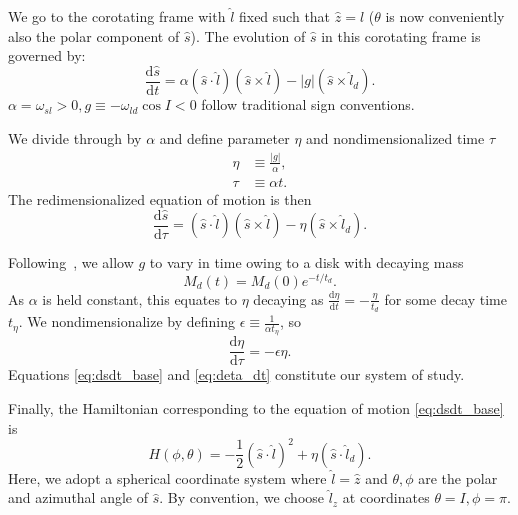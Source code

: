 \documentclass[
        fleqn,
        usenatbib,
    ]{mnras}
\newcommand*{\rd}[2]{\frac{\mathrm{d}#1}{\mathrm{d}#2}}
\newcommand*{\abs}[1]{\left|#1\right|}
\newcommand*{\p}[1]{\left(#1\right)}
\begin{document}
We go to the corotating frame with $\hat{l}$ fixed such that $\hat{z} =
\hat{l}$ ($\theta$ is now conveniently also the polar component of $\hat{s}$).
The evolution of $\hat{s}$ in this corotating frame is governed by:
\begin{equation}
    \rd{\hat{s}}{t} = \alpha \p{\hat{s} \cdot \hat{l}}
            \p{\hat{s} \times \hat{l}}
        - \abs{g}\p{\hat{s} \times \hat{l}_d}.
\end{equation}
$\alpha = \omega_{sl} > 0, g \equiv -\omega_{ld}\cos I < 0$ follow traditional
sign conventions.

We divide through by $\alpha$ and define parameter $\eta$ and nondimensionalized
time $\tau$
\begin{align}
    \eta &\equiv \frac{\abs{g}}{\alpha}\label{eq:eta},\\
    \tau &\equiv \alpha t.
\end{align}
The redimensionalized equation of motion is then
\begin{equation}
    \rd{\hat{s}}{\tau} = \p{\hat{s} \cdot \hat{l}}
            \p{\hat{s} \times \hat{l}}
        - \eta\p{\hat{s} \times \hat{l}_d}. \label{eq:dsdt_base}
\end{equation}

Following~\cite{millholland_disk}, we allow $g$ to vary in time owing to a
disk with decaying mass
\begin{equation}
    M_d(t) = M_d(0)e^{-t/t_d}.
\end{equation}
As $\alpha$ is held constant, this equates to $\eta$ decaying as $\rd{\eta}{t} =
-\frac{\eta}{t_d}$ for some decay time $t_\eta$. We nondimensionalize by
defining $\epsilon \equiv \frac{1}{\alpha t_\eta}$, so
\begin{equation}
    \rd{\eta}{\tau} = -\epsilon \eta.\label{eq:deta_dt}
\end{equation}
Equations \autoref{eq:dsdt_base} and \autoref{eq:deta_dt} constitute our system
of study.

Finally, the Hamiltonian corresponding to the equation of motion
\autoref{eq:dsdt_base} is
\begin{equation}
    H\p{\phi, \theta} = -\frac{1}{2}\p{\hat{s} \cdot \hat{l}}^2
        + \eta \p{\hat{s} \cdot \hat{l}_d}.\label{eq:H}
\end{equation}
Here, we adopt a spherical coordinate system where $\hat{l} = \hat{z}$ and
$\theta, \phi$ are the polar and azimuthal angle of $\hat{s}$. By convention, we
choose $\hat{l}_z$ at coordinates $\theta = I, \phi = \pi$.
\end{document}
